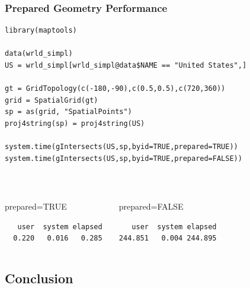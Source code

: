 \documentclass[slidestop,mathserif]{beamer}
\begin{document}
\begin{frame}[fragile]
\frametitle{Prepared Geometry Performance}

\begin{example}
{\footnotesize
\begin{verbatim}
library(maptools)

data(wrld_simpl)
US = wrld_simpl[wrld_simpl@data$NAME == "United States",]

gt = GridTopology(c(-180,-90),c(0.5,0.5),c(720,360))
grid = SpatialGrid(gt)
sp = as(grid, "SpatialPoints")
proj4string(sp) = proj4string(US)

system.time(gIntersects(US,sp,byid=TRUE,prepared=TRUE))
system.time(gIntersects(US,sp,byid=TRUE,prepared=FALSE))
\end{verbatim}
}
\end{example}

~\\ \pause

\begin{columns}
\begin{beamerboxesrounded}{prepared=TRUE}
\begin{verbatim}
   user  system elapsed 
  0.220   0.016   0.285
\end{verbatim}
\end{beamerboxesrounded}

\begin{beamerboxesrounded}{prepared=FALSE}
\begin{verbatim}
   user  system elapsed 
244.851   0.004 244.895
\end{verbatim}
\end{beamerboxesrounded}
\end{columns}
\end{frame}

\subsection{Conclusion}
\end{document}
